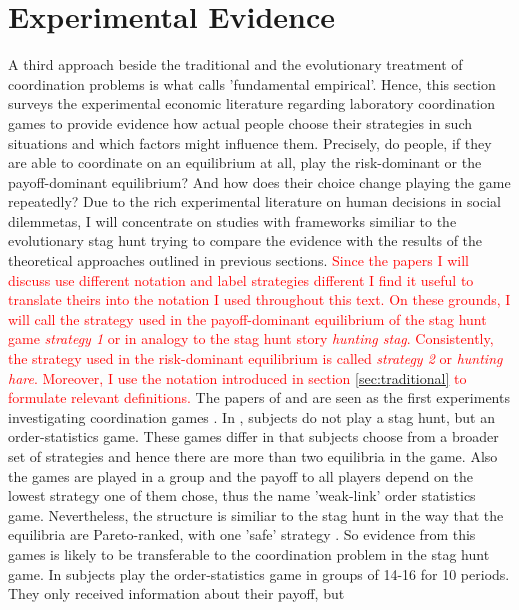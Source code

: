 \documentclass[11pt]{article}
\begin{document}
\section{Experimental Evidence}
A third approach beside the traditional and the evolutionary treatment of coordination problems is what \cite{camerer} calls 'fundamental empirical'.
Hence, this section surveys the experimental economic literature regarding 
laboratory coordination games to provide evidence how actual people choose
their strategies in such situations and which factors might influence them. 
Precisely, do people, if they are able to coordinate on an equilibrium at all,
play the risk-dominant or the payoff-dominant equilibrium? And how does their
choice change playing the game repeatedly?
Due to the rich experimental literature on human decisions in social dilemmetas, I will concentrate on studies with frameworks similiar to the evolutionary stag hunt trying to compare the evidence with the results of the theoretical approaches outlined in previous sections. 
\textcolor{red}{Since the papers I will discuss use different notation and 
label strategies different I find it useful to translate theirs into the
notation I used throughout this text. On these grounds, I will call the 
strategy used in the payoff-dominant equilibrium of the stag hunt game
\textit{strategy 1} or in analogy to the stag hunt story \textit{hunting stag}.
Consistently, the strategy used in the risk-dominant equilibrium is called
\textit{strategy 2} or \textit{hunting hare}. Moreover, I use the notation
introduced in section \ref{sec:traditional} to formulate relevant definitions.}
The papers of \textcite{van_huyck_tacit_1990} and \textcite{cooper_communication_1992} are 
seen as the first experiments investigating coordination games \parencite{devetag_when_2007}.
In \textcite{van_huyck_tacit_1990}, subjects do not play a stag
hunt, but an order-statistics game. These games differ in that subjects choose
from a broader set of strategies and hence there are more than two equilibria
in the game. Also the games are played in a group and the payoff to all 
players depend on the lowest strategy one of them chose, thus the name 
'weak-link' order statistics game. Nevertheless, the structure is similiar to 
the stag hunt in the way that the equilibria are Pareto-ranked, with one 
'safe' strategy \parencite{devetag_when_2007}. So evidence from this games is likely to 
be transferable to the coordination problem in the stag hunt game. In 
\cite{van_huyck_tacit_1990} subjects play the order-statistics game in groups of 
14-16 for 10 periods. They only received information about their payoff, but 
\end{document}
